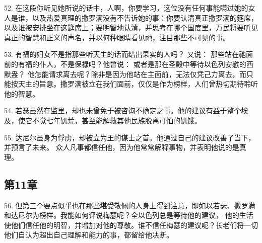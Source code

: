 52. 在这段你听见她所说的话中，人啊，你要学习，这位没有任何事能瞒过她的女人是谁，以及热爱真理的撒罗满没有不告诉她的事：你要认清真正撒罗满的筵席，以及谁被安排坐在这筵席上；要明智地认清，并思考在哪个国度里，万民将要听见真正的智慧和正义的声名，并以何种眼睛看见祂，注目那些不可见的事。 \par

53. 有福的妇女不是指那些听天主的话而结出果实的人吗？ 又说： 那些站在祂面前的有福的仆人，不是保禄吗？他曾说： 或者是那在圣殿中等待以色列安慰的西默盎？ 他怎能请求离去呢？除非是因为他站在主面前，无法仅凭己力离去，而只能按天主的旨意。撒罗满被立在我们面前，仅仅是作为榜样，人们曾热切期待聆听他的智慧。\par

54. 若瑟虽然在监里，却也未曾免于被咨询不确定之事。他的建议有益于整个埃及，使它不觉七年饥荒，甚至能解救其他民族脱离可怕的饥饿。\par

55. 达尼尔虽身为俘虏，却被立为王的谋士之首。他通过自己的建议改善了当下，并预言了未来。 众人凡事都信任他，因为他常常解释事物，并表明他说的是真理。\par


\subsection{第11章}

\par

56. 但第三个要点似乎也在那些堪受敬佩的人身上得到注意，即如以若瑟、撒罗满和达尼尔为榜样。我能如何评说梅瑟呢？全以色列总是等待他的建议， 他的生活使他们信任他的明智，并增加对他的尊敬。谁不信任梅瑟的建议呢？长老们将一切他们自认为超出自己理解和能力的事，都留给他决断。\par

